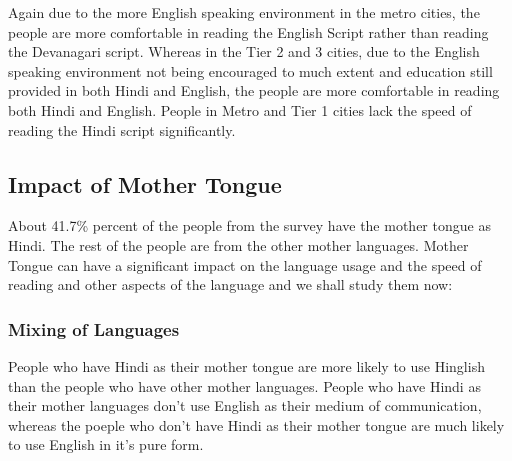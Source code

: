 \documentclass{article}
\begin{document}
Again due to the more English speaking environment in the metro cities, the people are more comfortable in reading the English Script rather than reading the Devanagari script. Whereas in the Tier 2 and 3 cities, due to the English speaking environment not being encouraged to much extent and education still provided in both Hindi and English, the people are more comfortable in reading both Hindi and English. People in Metro and Tier 1 cities lack the speed of reading the Hindi script significantly.



\subsection{Impact of Mother Tongue}

About 41.7\% percent of the people from the survey have the mother tongue as Hindi. The rest of the people are from the other mother languages. Mother Tongue can have a significant impact on the language usage and the speed of reading and other aspects of the language and we shall study them now:

\begin{figure}[H]
    \centering
\end{figure}

\subsubsection{Mixing of Languages}
People who have Hindi as their mother tongue are more likely to use Hinglish than the people who have other mother languages. People who have Hindi as their mother languages don't use English as their medium of communication, whereas the poeple who don't have Hindi as their mother tongue are much likely to use English in it's pure form.
\end{document}
